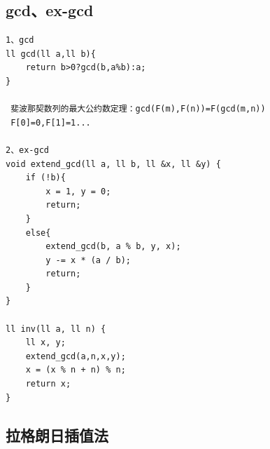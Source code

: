 \documentclass[twoside]{article}
\begin{document}
\subsection{gcd、ex-gcd}
\begin{lstlisting}
1、gcd
ll gcd(ll a,ll b){
    return b>0?gcd(b,a%b):a;
}

 斐波那契数列的最大公约数定理：gcd(F(m),F(n))=F(gcd(m,n))
 F[0]=0,F[1]=1...

2、ex-gcd
void extend_gcd(ll a, ll b, ll &x, ll &y) {
    if (!b){
        x = 1, y = 0;
        return;
    }
    else{
        extend_gcd(b, a % b, y, x);
        y -= x * (a / b);
        return;
    }
}

ll inv(ll a, ll n) {
    ll x, y;
    extend_gcd(a,n,x,y);
    x = (x % n + n) % n;
    return x;
}\end{lstlisting}
\subsection{拉格朗日插值法}
\end{document}
